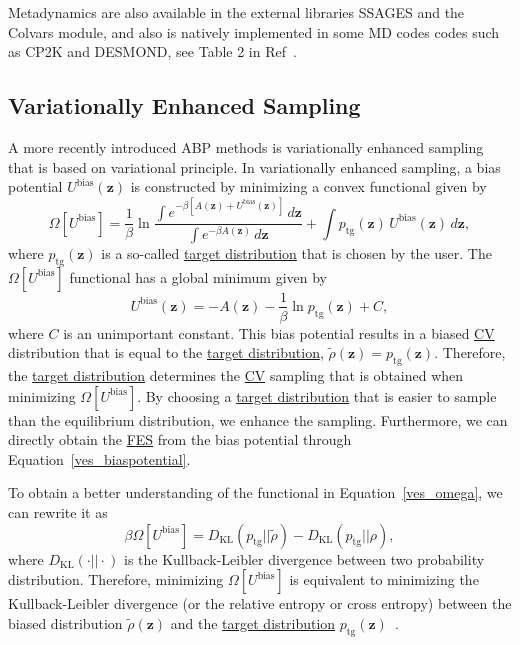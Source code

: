 \documentclass[9pt,review]{livecoms}
\newcommand{\vz}{\mathbf{z}}
\begin{document}
Metadynamics are also available in the external libraries SSAGES and the Colvars module, and also is natively implemented in some MD codes codes such as CP2K and DESMOND, see Table 2 in Ref~\cite{BussiLaio_ReviewMetaD_2020}.

\subsection{Variationally Enhanced Sampling}
\label{sec:ves}
A more recently introduced ABP methods is variationally enhanced
sampling~\cite{Valsson_VES_PRL_2014,Valsson2020Handbook_VES} that is based on variational principle.
In variationally enhanced sampling, a bias potential $U^{\mathrm{bias}}(\vz)$ is constructed by minimizing a convex functional given by
\begin{equation}
\label{ves_omega}
\Omega [U^{\mathrm{bias}}] =
\frac{1}{\beta} \ln
\frac
{\int e^{-\beta \left[ A(\vz) + U^{\mathrm{bias}}(\vz)\right]} \, d\vz }
{\int e^{-\beta A(\vz)} \, d\vz}
+
\int p_{\mathrm{tg}}(\vz) \, U^{\mathrm{bias}}(\vz) \, d\vz,
\end{equation}
where $p_{\mathrm{tg}}(\vz)$ is a so-called \hyperlink{ref:targetdist}{target distribution} that is chosen by the user. The $\Omega [U^{\mathrm{bias}}]$ functional has a global minimum given by
\begin{equation}
\label{ves_biaspotential}
U^{\mathrm{bias}}(\vz) = -A(\vz)- \frac{1}{\beta} \ln {p_{\mathrm{tg}}(\vz)} + C,
\end{equation}
where $C$ is an unimportant constant. This bias potential results in a biased \hyperlink{ref:CV} {CV} distribution that is equal to the \hyperlink{ref:targetdist}{target distribution}, $\tilde{\rho}(\vz) = p_{\mathrm{tg}}(\vz)$. Therefore, the \hyperlink{ref:targetdist}{target distribution} determines the \hyperlink{ref:CV} {CV} sampling that is obtained when minimizing $\Omega [U^{\mathrm{bias}}]$. By choosing a \hyperlink{ref:targetdist}{target distribution} that is easier to sample than the equilibrium distribution, we enhance the sampling. Furthermore, we can directly obtain the \hyperlink{ref:FES} {FES} from the bias potential through Equation~\ref{ves_biaspotential}.

To obtain a better understanding of the functional in Equation~\ref{ves_omega}, we can rewrite it as~\cite{Valsson2020Handbook_VES,Invernizzi-PNAS-2017}
\begin{equation}
\beta \Omega [U^{\mathrm{bias}}] = D_{\mathrm{KL}}(p_{\mathrm{tg}}||\tilde{\rho})-D_{\mathrm{KL}}(p_{\mathrm{tg}}||\rho),
\end{equation}
where $D_{\mathrm{KL}}(\cdot||\cdot)$ is the Kullback-Leibler divergence between two probability distribution. Therefore, minimizing $\Omega [U^{\mathrm{bias}}]$ is equivalent to minimizing the Kullback-Leibler divergence (or the relative entropy or cross entropy) between the biased distribution $\tilde{\rho}(\vz)$ and the \hyperlink{ref:targetdist}{target distribution} $p_{\mathrm{tg}}(\vz)$~\cite{Rubinstein-MetCompAppProb-1999,Shell-JCP-2008,Bilionis-JCompPhys-2012,Zhang_SIAM-JSC-2014}.
\end{document}
